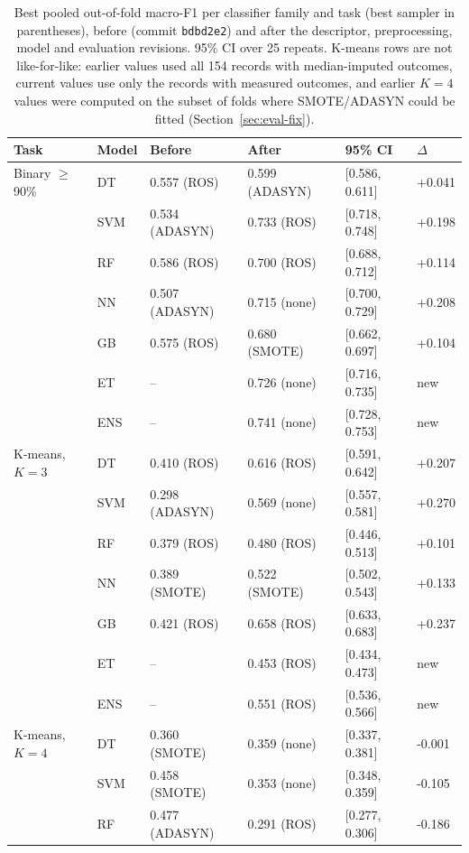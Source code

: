 \documentclass[11pt,a4paper]{article}
\begin{document}
\begin{table}[!htbp]
\centering\small
\caption{Best pooled out-of-fold macro-F1 per classifier family and task (best sampler in parentheses), before (commit \texttt{bdbd2e2}) and after the descriptor, preprocessing, model and evaluation revisions. 95\% CI over 25 repeats. K-means rows are not like-for-like: earlier values used all 154 records with median-imputed outcomes, current values use only the records with measured outcomes, and earlier $K=4$ values were computed on the subset of folds where SMOTE/ADASYN could be fitted (Section~\ref{sec:eval-fix}).}
\label{tab:beforeafter}
\begin{tabular}{llllll}
\toprule
Task & Model & Before & After & 95\% CI & $\Delta$ \\
\midrule
Binary $\geq$90\% & DT & 0.557 (ROS) & 0.599 (ADASYN) & [0.586, 0.611] & +0.041 \\
 & SVM & 0.534 (ADASYN) & 0.733 (ROS) & [0.718, 0.748] & +0.198 \\
 & RF & 0.586 (ROS) & 0.700 (ROS) & [0.688, 0.712] & +0.114 \\
 & NN & 0.507 (ADASYN) & 0.715 (none) & [0.700, 0.729] & +0.208 \\
 & GB & 0.575 (ROS) & 0.680 (SMOTE) & [0.662, 0.697] & +0.104 \\
 & ET & -- & 0.726 (none) & [0.716, 0.735] & new \\
 & ENS & -- & 0.741 (none) & [0.728, 0.753] & new \\
\midrule
K-means, $K=3$ & DT & 0.410 (ROS) & 0.616 (ROS) & [0.591, 0.642] & +0.207 \\
 & SVM & 0.298 (ADASYN) & 0.569 (none) & [0.557, 0.581] & +0.270 \\
 & RF & 0.379 (ROS) & 0.480 (ROS) & [0.446, 0.513] & +0.101 \\
 & NN & 0.389 (SMOTE) & 0.522 (SMOTE) & [0.502, 0.543] & +0.133 \\
 & GB & 0.421 (ROS) & 0.658 (ROS) & [0.633, 0.683] & +0.237 \\
 & ET & -- & 0.453 (ROS) & [0.434, 0.473] & new \\
 & ENS & -- & 0.551 (ROS) & [0.536, 0.566] & new \\
\midrule
K-means, $K=4$ & DT & 0.360 (SMOTE) & 0.359 (none) & [0.337, 0.381] & -0.001 \\
 & SVM & 0.458 (SMOTE) & 0.353 (none) & [0.348, 0.359] & -0.105 \\
 & RF & 0.477 (ADASYN) & 0.291 (ROS) & [0.277, 0.306] & -0.186 \\

\end{tabular}
\end{table}
\end{document}
